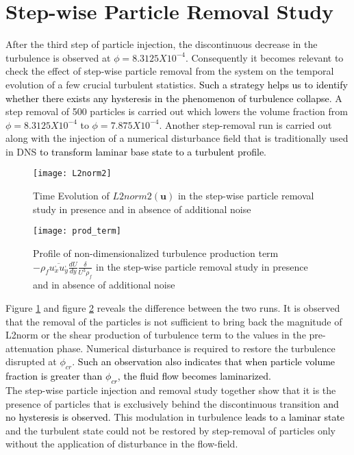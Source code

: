 \documentclass[aip,graphicx]{revtex4-1}
\begin{document}
\section{Step-wise Particle Removal Study}
After the third step of particle injection, the discontinuous decrease in the turbulence is observed at $\phi=8.3125X10^{-4}$. Consequently it becomes relevant to check the effect of step-wise particle removal from the system on the temporal evolution of a few crucial turbulent statistics. \textcolor{black}{Such a strategy helps us to identify whether there exists any hysteresis in the phenomenon of turbulence collapse}. A step removal of 500 particles is carried out which lowers the volume fraction from $\phi=8.3125X10^{-4}$ to $\phi=7.875X10^{-4}$. Another step-removal run is carried out along with the injection of a numerical  disturbance field that is traditionally used in DNS \textcolor{black}{to transform laminar base state to a turbulent profile}. 
\begin{figure}[!]
\centering
	\texttt{[image: L2norm2]}
	\caption{Time Evolution of $L2norm2(\mathbf u)$ in the step-wise particle removal study in presence and in absence of additional noise} 
	\label{fig:L2norm_step_removal}
\end{figure}
\begin{figure}[!]
\centering
	\texttt{[image: prod\_term]}
	\caption{Profile of non-dimensionalized turbulence production term $-\rho_f\overline{u_x^, u_y^,}\frac{dU}{dy}\frac{\delta}{U^3\rho_f}$ in the step-wise particle removal study in presence and in absence of additional noise} 
	\label{fig:prodstep_removal}
\end{figure}
Figure \ref{fig:L2norm_step_removal} and figure \ref{fig:prodstep_removal} reveals the difference between the two runs. It is observed that the removal of the particles is not sufficient to bring back the magnitude of L2norm or the shear production of turbulence term to the values in the pre-attenuation phase. Numerical disturbance is required to restore the turbulence disrupted at $\phi_{cr}$. \textcolor{black}{Such an observation also indicates that when particle volume fraction is greater than $\phi_{cr}$, the fluid flow becomes laminarized.}  
\\ The step-wise particle injection and removal study together show that it is the presence of particles that is exclusively behind the discontinuous transition \textcolor{black}{and no hysteresis is observed.}
This modulation in turbulence \textcolor{black}{leads to a laminar state} and the turbulent state could not be restored by step-removal of particles only without the application of disturbance in the flow-field. 
\end{document}
